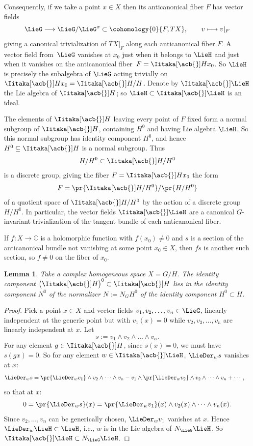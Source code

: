 \documentclass[pdftex]{sigma}
\numberwithin{equation}{section}
\newtheorem{Lemma}[Theorem]{Lemma}
\renewcommand{\C}{\mathbb{C}}
\newcommand*{\acf}[1]{\Iitaka[\acb{}]{#1}}
\begin{document}
Consequently, if we take a point $x \in X$ then its anticanonical fiber $F$ has vector fields
\[
\LieG \longrightarrow \LieG/\LieG^x \subset \cohomology{0}{F, TX}, \qquad
v \longmapsto v|_F
\]
giving a canonical trivialization of $ TX|_F$ along each anticanonical fiber $F$.
A vector field from~$\LieG$ vanishes at $x_0$ just when it belongs to $\LieH$ and just when it vanishes on the anticanonical
fiber~${F = \acf{H}x_0}$.
So $\LieH$ is precisely the subalgebra of $\LieG$ acting trivially on $\acf{H}x_0 = \acf{H}/H$.
Denote by $\acf\LieH$ the Lie algebra of $\acf{H}$; so $\LieH \subset \acf\LieH$ is an ideal.

The elements of $\acf{H}$ leaving every point of $F$ fixed form a normal subgroup of $\acf{H}$, containing $H^0$ and having Lie algebra $\LieH$.
So this normal subgroup has identity component $H^0$, and hence $H^0 \subseteq \acf{H}$ is a normal subgroup.
Thus
\[
H/H^0 \subset \acf{H}/H^0
\]
is a discrete group, giving the fiber $F = \acf{H}x_0$ the form
\[
F = \pr{\acf{H}/H^0}/\pr{H/H^0}
\]
of a quotient space of $\acf{H}/H^0$ by the action of a discrete group $H/H^0$.
In particular, the vector fields $\acf\LieH$ are a canonical $G$-invariant trivialization of the tangent bundle of each anticanonical fiber.

If $f \colon X \to \C$ is a holomorphic function with $f(x_0) \ne 0$ and $s$ is a section of the anticanonical bundle not vanishing at some point $x_0 \in X$, then $fs$ is another such section, so $f\ne 0$ on the fiber of $x_0$.

\begin{Lemma}
Take a complex homogeneous space $X = G/H$.
The identity component $\big(\acf{H}\big)^0 \subset \acf{H}$ lies in the identity component $N^0$ of the
normalizer $N := N_G H^0$ of the identity component $H^0 \subset H$.
\end{Lemma}

\begin{proof}
Pick a point $x \in X$ and vector fields $v_1, v_2, \dots, v_n \in \LieG$, linearly independent at the generic point
but with $v_1(x) = 0$ while $v_2, v_3, \dots, v_n$ are linearly independent at $x$.
Let
\[
s := v_1 \wedge v_2 \wedge \dots \wedge v_n.
\]
For any element $g \in \acf{H}$, since $s(x) = 0$, we must have $s(gx) = 0$.
So for any element $w \in \acf\LieH$, $\LieDer_w s$ vanishes at $x$:
\begin{align*}
\LieDer_w s
& =
\pr{\LieDer_w v_1} \wedge v_2 \wedge \dots \wedge v_n - v_1 \wedge \pr{\LieDer_w v_2} \wedge v_2 \wedge \dots \wedge v_n + \cdots,
\end{align*}
so that at $x$:
\[
0 = \pr{\LieDer_w s}(x) = \pr{\LieDer_w v_1}(x) \wedge v_2(x) \wedge \dots \wedge v_n(x).
\]
Since $v_2, \dots, v_n$ can be generically chosen, $\LieDer_w v_1$ vanishes at $x$.
Hence $\LieDer_w \LieH \subset \LieH$, i.e., $w$ is in the Lie algebra of $N_{\LieG} \LieH$.
So $\acf\LieH \subset N_{\LieG} \LieH$.
\end{proof}
\end{document}
